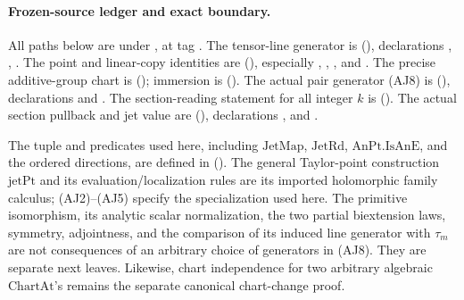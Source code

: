 \paragraph{Frozen-source ledger and exact boundary.}
All paths below are under
,
at tag .
The tensor-line generator is
(),
declarations ,
, .
The point and linear-copy identities are
(),
especially ,
, ,
 and .
The precise additive-group chart is
();
immersion is
().
The actual pair generator (AJ8) is
(),
declarations  and .
The section-reading statement for all integer \(k\) is
().
The actual section pullback and jet value are
(),
declarations , 
and .

The tuple and predicates used here, including \(\mathrm{JetMap}\),
\(\mathrm{JetRd}\), \(\mathrm{AnPt.IsAnE}\), and the ordered
directions, are defined in
().
The general Taylor-point construction \(\mathrm{jetPt}\) and
its evaluation/localization rules are its imported holomorphic
family calculus; (AJ2)--(AJ5) specify the specialization used here.
The primitive isomorphism, its analytic scalar normalization,
the two partial biextension laws, symmetry, adjointness, and the
comparison of its induced line generator with \(\tau_m\) are
not consequences of an arbitrary choice of generators in (AJ8).
They are separate next leaves. Likewise, chart independence for
two arbitrary algebraic \(\mathrm{ChartAt}\)'s remains the
separate canonical chart-change proof.
